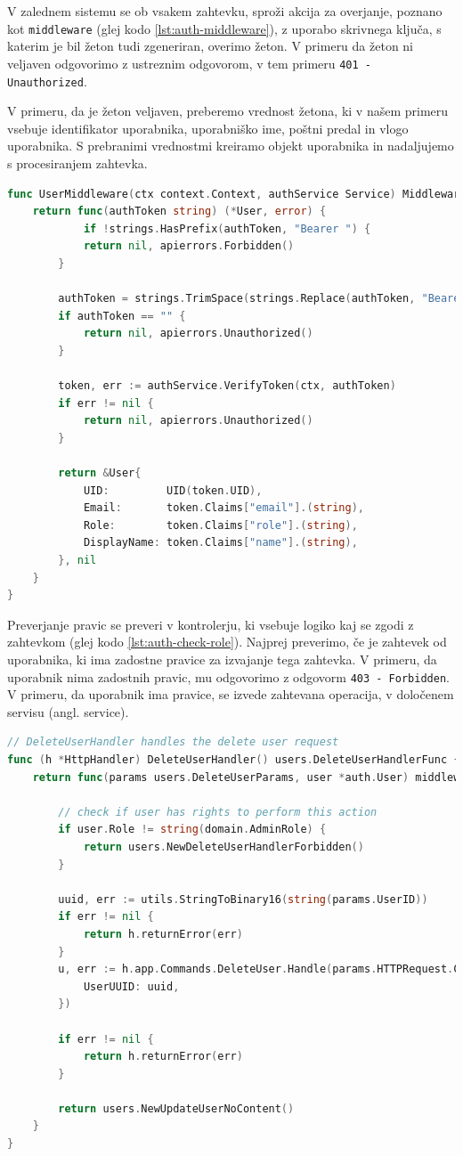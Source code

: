 \documentclass[a4paper, 12pt]{book}
\begin{document}
V zalednem sistemu se ob vsakem zahtevku, sproži akcija za overjanje, poznano kot \verb=middleware= (glej kodo \ref{lst:auth-middleware}), z uporabo skrivnega ključa, s katerim je bil žeton tudi zgeneriran, overimo žeton. V primeru da žeton ni veljaven odgovorimo z ustreznim odgovorom, v tem primeru \verb=401 - Unauthorized=. 

V primeru, da je žeton veljaven, preberemo vrednost žetona, ki v našem primeru vsebuje identifikator uporabnika, uporabniško ime, poštni predal in vlogo uporabnika. S prebranimi vrednostmi kreiramo objekt uporabnika in nadaljujemo s procesiranjem zahtevka.

\begin{lstlisting}[language=go,style=mystyle,caption={Izsek kode za preverjanje pristnosti uporabnika},label=lst:auth-middleware]
func UserMiddleware(ctx context.Context, authService Service) MiddlewareFunc {
	return func(authToken string) (*User, error) {
			if !strings.HasPrefix(authToken, "Bearer ") {
			return nil, apierrors.Forbidden()
		}

		authToken = strings.TrimSpace(strings.Replace(authToken, "Bearer", "", 1))
		if authToken == "" {
			return nil, apierrors.Unauthorized()
		}

		token, err := authService.VerifyToken(ctx, authToken)
		if err != nil {
			return nil, apierrors.Unauthorized()
		}
		
		return &User{
			UID:         UID(token.UID),
			Email:       token.Claims["email"].(string),
			Role:        token.Claims["role"].(string),
			DisplayName: token.Claims["name"].(string),
		}, nil
	}
}
\end{lstlisting}

Preverjanje pravic se preveri v kontrolerju, ki vsebuje logiko kaj se zgodi z zahtevkom (glej kodo \ref{lst:auth-check-role}). Najprej preverimo, če je zahtevek od uporabnika, ki ima zadostne pravice za izvajanje tega zahtevka. V primeru, da uporabnik nima zadostnih pravic, mu odgovorimo z odgovorm \verb=403 - Forbidden=. V primeru, da uporabnik ima pravice, se izvede zahtevana operacija, v določenem servisu (angl. service).

\begin{lstlisting}[language=go,style=mystyle,caption={Izsek kode za preverjanje pravic uporabnika},label=lst:auth-check-role]
// DeleteUserHandler handles the delete user request
func (h *HttpHandler) DeleteUserHandler() users.DeleteUserHandlerFunc {
	return func(params users.DeleteUserParams, user *auth.User) middleware.Responder {

		// check if user has rights to perform this action
		if user.Role != string(domain.AdminRole) {
			return users.NewDeleteUserHandlerForbidden()
		}

		uuid, err := utils.StringToBinary16(string(params.UserID))
		if err != nil {
			return h.returnError(err)
		}
		u, err := h.app.Commands.DeleteUser.Handle(params.HTTPRequest.Context(), command.DeleteParamsCmd{
			UserUUID: uuid,
		})

		if err != nil {
			return h.returnError(err)
		}

		return users.NewUpdateUserNoContent()
	}
}
\end{lstlisting}
\end{document}
